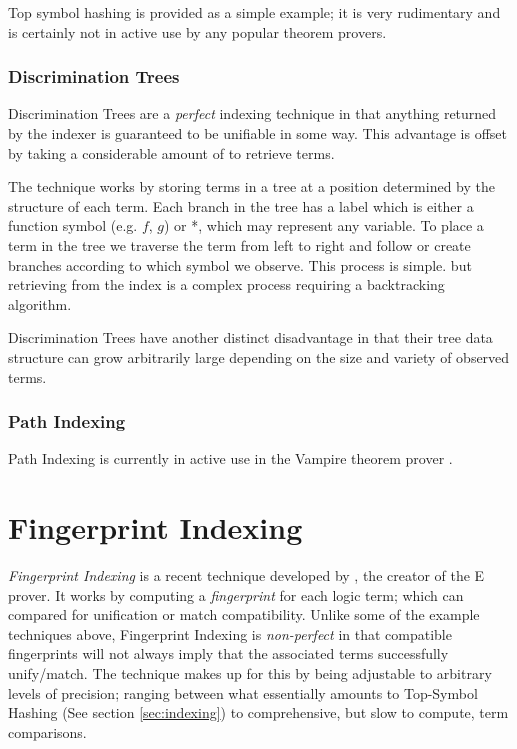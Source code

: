 Top symbol hashing is provided as a simple example; it is very rudimentary and
is certainly not in active use by any popular theorem provers.

\subsubsection{Discrimination Trees}

Discrimination Trees are a \emph{perfect} indexing technique in that anything
returned by the indexer is guaranteed to be unifiable in some way. This advantage
is offset by taking a considerable amount of to retrieve terms.

The technique works by storing terms in a tree at a position determined by the structure
of each term. Each branch in the tree has a label which is either a function symbol
(e.g. $f$, $g$) or *, which may represent any variable. To place a term in the tree
we traverse the term from left to right and follow or create branches according to
which symbol we observe. This process is simple. but retrieving from the index is a
complex process requiring a backtracking algorithm.

Discrimination Trees have another distinct disadvantage in that their tree data
structure can grow arbitrarily large depending on the size and variety of observed terms.

\subsubsection{Path Indexing}

Path Indexing is currently in active use in the Vampire theorem prover \cite{vampire}.

\section{Fingerprint Indexing}
\label{sec:fingerprint}

\emph{Fingerprint Indexing} is a recent technique developed by , the creator
of the E prover. It works by computing a \emph{fingerprint} for each logic term;
which can compared for unification or match compatibility. 
Unlike some of the example techniques above,
Fingerprint Indexing is \emph{non-perfect} in that compatible fingerprints will not
always imply that the associated terms successfully unify/match. The technique
makes up for this by being adjustable to arbitrary levels of precision; ranging between
what essentially amounts to Top-Symbol Hashing (See section \ref{sec:indexing})
to comprehensive, but slow to compute, term comparisons.

